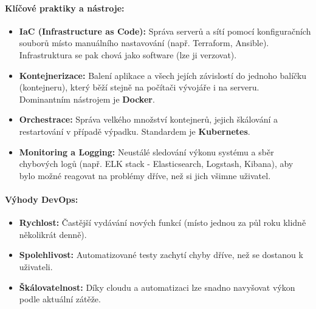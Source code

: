 \paragraph*{Klíčové praktiky a nástroje:}
\begin{itemize}
    \item \textbf{IaC (Infrastructure as Code):} Správa serverů a sítí pomocí konfiguračních souborů místo manuálního nastavování (např. Terraform, Ansible). Infrastruktura se pak chová jako software (lze ji verzovat).
    \item \textbf{Kontejnerizace:} Balení aplikace a všech jejích závislostí do jednoho balíčku (kontejneru), který běží stejně na počítači vývojáře i na serveru. Dominantním nástrojem je \textbf{Docker}.
    \item \textbf{Orchestrace:} Správa velkého množství kontejnerů, jejich škálování a restartování v případě výpadku. Standardem je \textbf{Kubernetes}.
    \item \textbf{Monitoring a Logging:} Neustálé sledování výkonu systému a sběr chybových logů (např. ELK stack - Elasticsearch, Logstash, Kibana), aby bylo možné reagovat na problémy dříve, než si jich všimne uživatel.
\end{itemize}

\paragraph*{Výhody DevOps:}
\begin{itemize}
    \item \textbf{Rychlost:} Častější vydávání nových funkcí (místo jednou za půl roku klidně několikrát denně).
    \item \textbf{Spolehlivost:} Automatizované testy zachytí chyby dříve, než se dostanou k uživateli.
    \item \textbf{Škálovatelnost:} Díky cloudu a automatizaci lze snadno navyšovat výkon podle aktuální zátěže.
\end{itemize}

